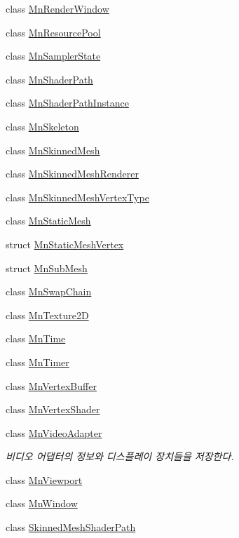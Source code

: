 \begin{DoxyCompactItemize}
\item 
class \hyperlink{class_m_n_l_1_1_mn_render_window}{Mn\+Render\+Window}
\item 
class \hyperlink{class_m_n_l_1_1_mn_resource_pool}{Mn\+Resource\+Pool}
\item 
class \hyperlink{class_m_n_l_1_1_mn_sampler_state}{Mn\+Sampler\+State}
\item 
class \hyperlink{class_m_n_l_1_1_mn_shader_path}{Mn\+Shader\+Path}
\item 
class \hyperlink{class_m_n_l_1_1_mn_shader_path_instance}{Mn\+Shader\+Path\+Instance}
\item 
class \hyperlink{class_m_n_l_1_1_mn_skeleton}{Mn\+Skeleton}
\item 
class \hyperlink{class_m_n_l_1_1_mn_skinned_mesh}{Mn\+Skinned\+Mesh}
\item 
class \hyperlink{class_m_n_l_1_1_mn_skinned_mesh_renderer}{Mn\+Skinned\+Mesh\+Renderer}
\item 
class \hyperlink{class_m_n_l_1_1_mn_skinned_mesh_vertex_type}{Mn\+Skinned\+Mesh\+Vertex\+Type}
\item 
class \hyperlink{class_m_n_l_1_1_mn_static_mesh}{Mn\+Static\+Mesh}
\item 
struct \hyperlink{struct_m_n_l_1_1_mn_static_mesh_vertex}{Mn\+Static\+Mesh\+Vertex}
\item 
struct \hyperlink{struct_m_n_l_1_1_mn_sub_mesh}{Mn\+Sub\+Mesh}
\item 
class \hyperlink{class_m_n_l_1_1_mn_swap_chain}{Mn\+Swap\+Chain}
\item 
class \hyperlink{class_m_n_l_1_1_mn_texture2_d}{Mn\+Texture2D}
\item 
class \hyperlink{class_m_n_l_1_1_mn_time}{Mn\+Time}
\item 
class \hyperlink{class_m_n_l_1_1_mn_timer}{Mn\+Timer}
\item 
class \hyperlink{class_m_n_l_1_1_mn_vertex_buffer}{Mn\+Vertex\+Buffer}
\item 
class \hyperlink{class_m_n_l_1_1_mn_vertex_shader}{Mn\+Vertex\+Shader}
\item 
class \hyperlink{class_m_n_l_1_1_mn_video_adapter}{Mn\+Video\+Adapter}
\begin{DoxyCompactList}\small\item\em 비디오 어댑터의 정보와 디스플레이 장치들을 저장한다. \end{DoxyCompactList}\item 
class \hyperlink{class_m_n_l_1_1_mn_viewport}{Mn\+Viewport}
\item 
class \hyperlink{class_m_n_l_1_1_mn_window}{Mn\+Window}
\item 
class \hyperlink{class_m_n_l_1_1_skinned_mesh_shader_path}{Skinned\+Mesh\+Shader\+Path}
\end{DoxyCompactItemize}
